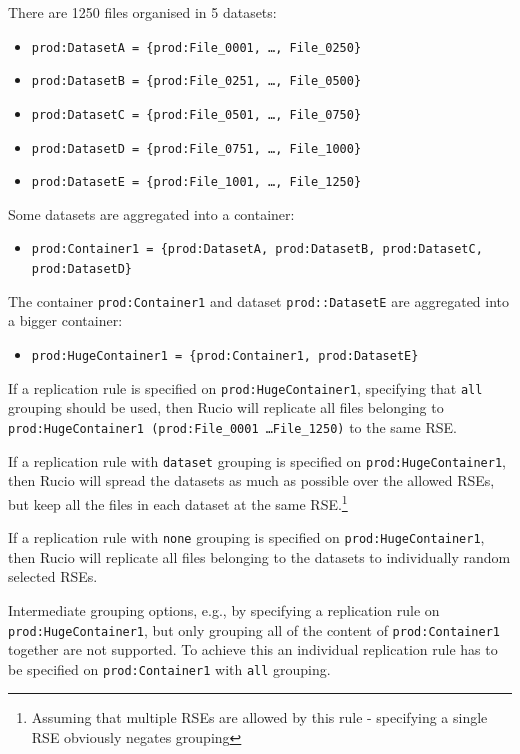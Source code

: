 \documentclass{atlasnote}
\begin{document}
There are 1250 files organised in 5 datasets:
\begin{itemize}
\item[] \texttt{prod:DatasetA = \{prod:File\_0001, \ldots, File\_0250\}}
\item[] \texttt{prod:DatasetB = \{prod:File\_0251, \ldots, File\_0500\}}
\item[] \texttt{prod:DatasetC = \{prod:File\_0501, \ldots, File\_0750\}}
\item[] \texttt{prod:DatasetD = \{prod:File\_0751, \ldots, File\_1000\}}
\item[] \texttt{prod:DatasetE = \{prod:File\_1001, \ldots, File\_1250\}}
\end{itemize}

Some datasets are aggregated into a container:
\begin{itemize}
\item[] \texttt{prod:Container1 = \{prod:DatasetA, prod:DatasetB, prod:DatasetC, prod:DatasetD\}}
\end{itemize}

The container \texttt{prod:Container1} and dataset \texttt{prod::DatasetE} are aggregated into a bigger container:
\begin{itemize}
\item[] \texttt{prod:HugeContainer1 = \{prod:Container1, prod:DatasetE\}}
\end{itemize}

If a replication rule is specified on \texttt{prod:HugeContainer1}, specifying that \texttt{all} grouping should be used, then Rucio will replicate all files belonging to \texttt{prod:HugeContainer1 (prod:File\_0001 \dots File\_1250)} to the same RSE.

If a replication rule with \texttt{dataset} grouping is specified on \texttt{prod:HugeContainer1}, then Rucio will spread the datasets as much as possible over the allowed RSEs, but keep all the files in each dataset at the same RSE.\footnote{Assuming that multiple RSEs are allowed by this rule - specifying a single RSE obviously negates grouping}

If a replication rule with \texttt{none} grouping is specified on \texttt{prod:HugeContainer1}, then Rucio will replicate all files belonging to the datasets to individually random selected RSEs.

Intermediate grouping options, e.g., by specifying a replication rule on \texttt{prod:HugeContainer1}, but only grouping all of the content of \texttt{prod:Container1} together are not supported. To achieve this an individual replication rule has to be specified on \texttt{prod:Container1} with \texttt{all} grouping.
\end{document}
